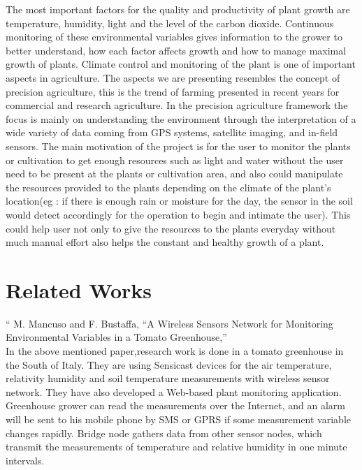 \documentclass[10pt]{article}
\begin{document}
The most important factors for the quality and productivity of plant growth are temperature, humidity, light and the level of the carbon dioxide. 
Continuous monitoring of these environmental variables gives information to the grower to better understand, how each factor affects growth and how to manage maximal growth of plants. 
Climate control and monitoring of the plant is one of important aspects in agriculture. 
The aspects we are presenting resembles the concept of precision agriculture, this is the trend of farming presented in recent years for commercial and research agriculture. 
In the precision agriculture framework the focus is mainly on understanding the environment through the interpretation of a wide variety of data coming from GPS systems, satellite imaging, and in-field sensors. 
The main motivation of the project is for the user to monitor the plants or cultivation to get enough resources such as light and water without the user need to be present at the plants or cultivation area, and also could manipulate the resources provided to the plants depending on the climate of the plant’s location(eg : if there is enough rain or moisture for the day, the sensor in the soil would detect accordingly for the operation to begin and intimate the user).
This could help user not only to give the resources to the plants everyday without much manual effort also helps the constant and healthy growth of a plant.


\section*{Related Works}

“ M. Mancuso and F. Bustaffa, “A Wireless Sensors Network for Monitoring Environmental Variables in a Tomato Greenhouse,”\\


In the above mentioned paper,research work is done in a tomato greenhouse in the South of Italy. 
They are using Sensicast devices for the air temperature, relativity humidity and soil temperature measurements with wireless sensor network. 
They have also developed a Web-based plant monitoring application. 
Greenhouse grower can read the measurements over the Internet, and an alarm will be sent to his mobile phone by SMS or GPRS if some measurement variable changes rapidly. 
Bridge node gathers data from other sensor nodes, which transmit the measurements of temperature and relative humidity in one minute intervals. 
\end{document}
